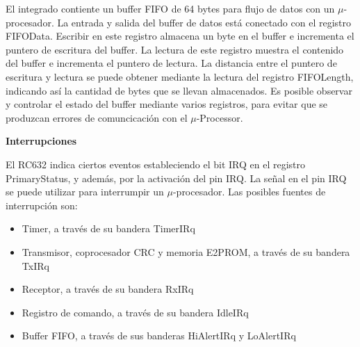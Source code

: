 El integrado contiente un buffer FIFO de 64 bytes para flujo de datos con un $\mu$-procesador.
La entrada y salida del buffer de datos está conectado con el registro FIFOData. Escribir en este registro almacena un byte en el buffer e incrementa el puntero de escritura del buffer. La lectura de este registro muestra el contenido del buffer e incrementa el puntero de lectura. La distancia entre el puntero de escritura y lectura se puede obtener mediante la lectura del registro FIFOLength, indicando así la cantidad de bytes que se llevan almacenados. Es posible observar y controlar el estado del buffer mediante varios registros, para evitar que se produzcan errores de comuncicación con el $\mu$-Processor.

\bigskip
{\bf{Interrupciones}}

El RC632 indica ciertos eventos estableciendo el bit IRQ en el registro PrimaryStatus, y además, por la activación del pin IRQ. La señal en el pin IRQ se puede utilizar para interrumpir un $\mu$-procesador. 
Las posibles fuentes de interrupción son: 

\begin{itemize}

\item Timer, a través de su bandera TimerIRq 
\item Transmisor, coprocesador CRC y memoria E2PROM, a través de su bandera TxIRq 
\item Receptor, a través de su bandera RxIRq 
\item Registro de comando, a través de su bandera IdleIRq 
\item Buffer FIFO, a través de sus banderas HiAlertIRq y LoAlertIRq 

\end{itemize}

